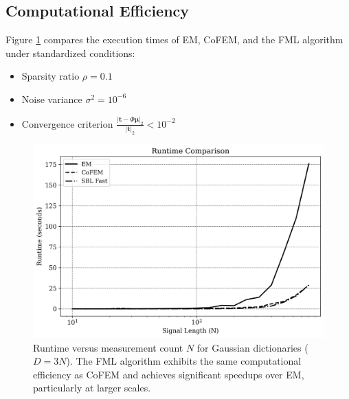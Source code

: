 \documentclass{article}
\begin{document}
\subsection{Computational Efficiency}
Figure \ref{fig:runtimeSBl} compares the execution times of EM, CoFEM, and the FML algorithm under standardized conditions:
\begin{itemize}
\item Sparsity ratio $ \rho = 0.1 $
\item Noise variance $ \sigma^2 = 10^{-6} $
\item Convergence criterion $\frac{|\mathbf{t} - \Phi \boldsymbol{\mu}|_2}{|\mathbf{t}|_2} < 10^{-2}$
\end{itemize}


\begin{figure}[H]
    \centering
    \includegraphics[width=0.75\linewidth]{Figures/runtime_comp_EMCoFEMSBL.png}
    \caption{Runtime versus measurement count $N$ for Gaussian dictionaries ($D=3N$). The FML algorithm exhibits the same computational efficiency as CoFEM and achieves significant speedups over EM, particularly at larger scales.}
    \label{fig:runtimeSBl}
\end{figure}
\end{document}
